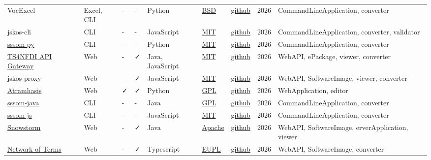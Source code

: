 \documentclass[
  DIV=10]{article}
\begin{document}
\begin{longtable}[]{@{}lllllllll@{}}
VocExcel & Excel, CLI & - & - & Python &
\href{https://spdx.org/licenses/BSD-3-Clause}{BSD} &
\href{https://github.com/Kurrawong/VocExcel}{github} & 2026 &
CommandLineApplication, converter \\
jskos-cli & CLI & - & - & JavaScript &
\href{https://spdx.org/licenses/MIT}{MIT} &
\href{https://github.com/gbv/jskos-cli/}{github} & 2026 &
CommandLineApplication, converter, validator \\
\href{https://mapping-commons.github.io/sssom-py}{sssom-py} & CLI & - &
- & Python & \href{https://spdx.org/licenses/MIT}{MIT} &
\href{https://github.com/mapping-commons/sssom-py}{github} & 2026 &
CommandLineApplication, converter \\
\href{https://ts4nfdi.github.io/api-gateway/}{TS4NFDI API Gateway} & Web
& - & ✓ & Java, JavaScript & \href{https://spdx.org/licenses/MIT}{MIT} &
\href{https://github.com/ts4nfdi/api-gateway}{github} & 2026 & WebAPI,
ePackage, viewer, converter \\
jskos-proxy & Web & - & ✓ & JavaScript &
\href{https://spdx.org/licenses/MIT}{MIT} &
\href{https://github.com/gbv/jskos-proxy/}{github} & 2026 & WebAPI,
SoftwareImage, viewer, converter \\
\href{https://atramhasis.readthedocs.io/en/latest/}{Atramhasis} & Web &
✓ & ✓ & Python & \href{https://spdx.org/licenses/GPL-3.0-or-later}{GPL}
& \href{https://github.com/OnroerendErfgoed/atramhasis}{github} & 2026 &
WebApplication, editor \\
\href{https://incenp.org/dvlpt/sssom-java/}{sssom-java} & CLI & - & - &
Java & \href{https://spdx.org/licenses/GPL-3.0-or-later}{GPL} &
\href{https://github.com/gouttegd/sssom-java}{github} & 2026 &
CommandLineApplication, converter \\
\href{https://www.npmjs.org/package/sssom}{sssom-js} & CLI & - & - &
JavaScript & \href{https://spdx.org/licenses/MIT}{MIT} &
\href{https://github.com/gbv/sssom-js}{github} & 2026 &
CommandLineApplication, converter \\
\href{https://github.com/IHTSDO/snowstorm}{Snowstorm} & Web & - & ✓ &
Java & \href{https://spdx.org/licenses/Apache-2.0}{Apache} &
\href{https://github.com/IHTSDO/snowstorm}{github} & 2026 & WebAPI,
SoftwareImage, erverApplication, viewer \\
\href{https://github.com/netwerk-digitaal-erfgoed/network-of-terms}{Network
of Terms} & Web & - & ✓ & Typescript &
\href{https://spdx.org/licenses/EUPL-1.2}{EUPL} &
\href{https://github.com/netwerk-digitaal-erfgoed/network-of-terms}{github}
& 2026 & WebAPI, SoftwareImage, converter \\

\end{longtable}
\end{document}
